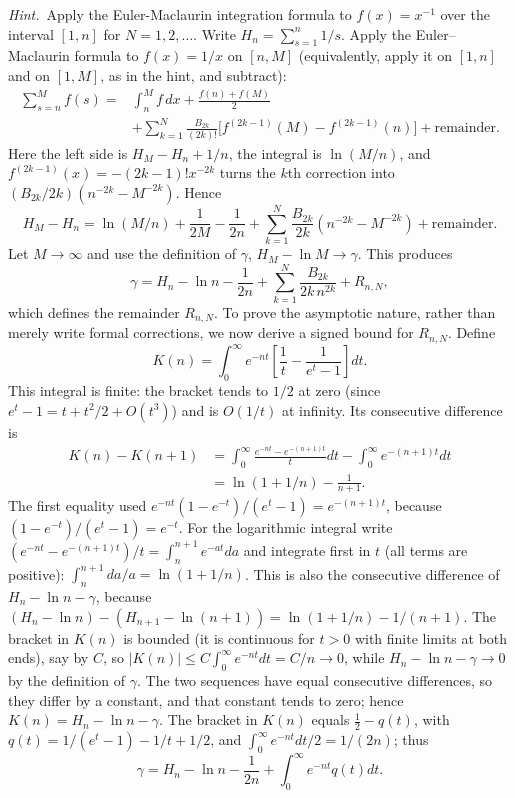 \emph{Hint.}~Apply the Euler-Maclaurin integration formula to $f(x)=x^{-1}$
over the interval $[1,n]$ for $N=1,2,\ldots$.
\solution
Write $H_n=\sum_{s=1}^n1/s$. Apply the Euler--Maclaurin formula to
$f(x)=1/x$ on $[n,M]$ (equivalently, apply it on $[1,n]$ and on
$[1,M]$, as in the hint, and subtract):
\begin{align*}
\sum_{s=n}^Mf(s)={}&\int_n^Mf\,dx+\frac{f(n)+f(M)}2\\
&+\sum_{k=1}^N\frac{B_{2k}}{(2k)!}
 \bigl[f^{(2k-1)}(M)-f^{(2k-1)}(n)\bigr]+\text{remainder}.
\end{align*}
Here the left side is $H_M-H_n+1/n$, the integral is $\ln(M/n)$, and
$f^{(2k-1)}(x)=-(2k-1)!x^{-2k}$ turns the $k$th correction into
$(B_{2k}/2k)(n^{-2k}-M^{-2k})$. Hence
\[
H_M-H_n=\ln(M/n)+\frac1{2M}-\frac1{2n}
+\sum_{k=1}^N\frac{B_{2k}}{2k}
 (n^{-2k}-M^{-2k})+\text{remainder}.
\]
Let $M\to\infty$ and use the definition of $\gamma$,
$H_M-\ln M\to\gamma$. This produces
\[
\gamma=H_n-\ln n-\frac1{2n}
+\sum_{k=1}^N\frac{B_{2k}}{2k\,n^{2k}}+R_{n,N},
\]
which defines the remainder $R_{n,N}$.
To prove the asymptotic nature, rather than merely write formal
corrections, we now derive a signed bound for $R_{n,N}$.
Define
\[
K(n)=\int_0^\infty e^{-nt}
 \left[\frac1t-\frac1{e^t-1}\right]dt.
\]
This integral is finite: the bracket tends to $1/2$ at zero (since
$e^t-1=t+t^2/2+O(t^3)$) and is $O(1/t)$ at infinity. Its consecutive
difference is
\begin{align*}
K(n)-K(n+1)
&=\int_0^\infty\frac{e^{-nt}-e^{-(n+1)t}}t dt
 -\int_0^\infty e^{-(n+1)t}dt\\
&=\ln(1+1/n)-\frac1{n+1}.
\end{align*}
The first equality used $e^{-nt}(1-e^{-t})/(e^t-1)=e^{-(n+1)t}$,
because $(1-e^{-t})/(e^t-1)=e^{-t}$. For the logarithmic integral write
$(e^{-nt}-e^{-(n+1)t})/t=\int_n^{n+1}e^{-at}da$ and integrate first in
$t$ (all terms are positive): $\int_n^{n+1}da/a=\ln(1+1/n)$. This is
also the consecutive difference of $H_n-\ln n-\gamma$, because
$(H_n-\ln n)-(H_{n+1}-\ln(n+1))=\ln(1+1/n)-1/(n+1)$. The bracket in
$K(n)$ is bounded (it is continuous for $t>0$ with finite limits at
both ends), say by $C$, so
$|K(n)|\le C\int_0^\infty e^{-nt}dt=C/n\to0$, while
$H_n-\ln n-\gamma\to0$ by the definition of $\gamma$. The two
sequences have equal consecutive differences, so they differ by a
constant, and that constant tends to zero; hence
$K(n)=H_n-\ln n-\gamma$. The bracket in $K(n)$ equals $\frac12-q(t)$,
with $q(t)=1/(e^t-1)-1/t+1/2$, and $\int_0^\infty e^{-nt}dt/2=1/(2n)$;
thus
\[
\gamma=H_n-\ln n-\frac1{2n}+\int_0^\infty e^{-nt}q(t)dt.
\]
